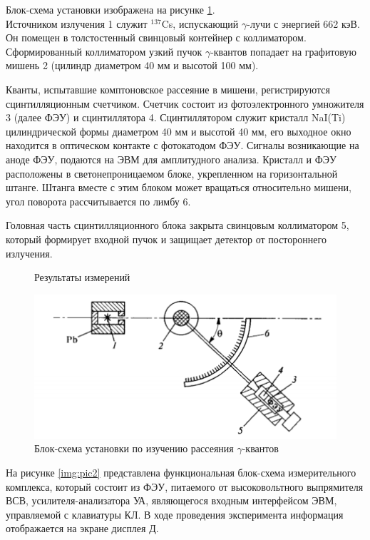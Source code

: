 \documentclass[reprint, nofootinbib, nobalancelastpage, 10pt]{revtex4-2}
\begin{document}
Блок-схема установки изображена на рисунке \ref{img:pic1}.\\ Источником излучения 1 служит
$^{137}$Cs, испускающий $\gamma$-лучи с энергией 662 кэВ. Он помещен в толстостенный
свинцовый контейнер с коллиматором. Сформированный коллиматором узкий пучок
$\gamma$-квантов попадает на графитовую мишень 2 (цилиндр диаметром 40 мм и высотой 100 мм).

Кванты, испытавшие комптоновское рассеяние в мишени, регистрируются сцинтилляционным
счетчиком. Счетчик состоит из фотоэлектронного умножителя 3 (далее ФЭУ) и сцинтиллятора 4.
Сцинтиллятором служит кристалл NaI(Ti) цилиндрической формы диаметром 40 мм и
высотой 40 мм, его выходное окно находится в оптическом контакте с фотокатодом ФЭУ.
Сигналы возникающие на аноде ФЭУ, подаются на ЭВМ для амплитудного анализа. Кристалл и ФЭУ
расположены в светонепроницаемом блоке, укрепленном на горизонтальной штанге. Штанга
вместе с этим блоком может вращаться относительно мишени, угол поворота рассчитывается по
лимбу 6.

Головная часть сцинтилляционного блока закрыта свинцовым коллиматором 5, который формирует
входной пучок и защищает детектор от постороннего излучения.

\begin{figure}[h!]	\caption{Результаты измерений}
	\label{tab:data}
	\includegraphics[width = \linewidth]{pic1.png}
	\caption{Блок-схема установки по изучению рассеяния $\gamma$-квантов}
	\label{img:pic1}
\end{figure}

На рисунке \ref{img:pic2} представлена функциональная блок-схема измерительного комплекса,
который состоит из ФЭУ, питаемого от высоковольтного выпрямителя ВСВ,
усилителя-анализатора УА, являющегося входным интерфейсом ЭВМ, управляемой с клавиатуры КЛ.
В ходе проведения эксперимента информация отображается на экране дисплея Д.
\end{document}
